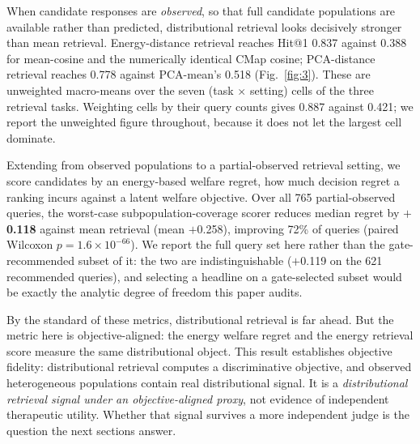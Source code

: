 \documentclass[11pt,letterpaper]{article}
\begin{document}
When candidate responses are \textit{observed}, so that full candidate populations are
available rather than predicted, distributional retrieval looks decisively stronger than mean
retrieval. Energy-distance retrieval reaches Hit@1 0.837 against 0.388 for
mean-cosine and the numerically identical CMap cosine; PCA-distance retrieval reaches 0.778 against
PCA-mean's 0.518 (Fig.~\ref{fig:3}). These are unweighted macro-means over the seven (task
$\times$ setting) cells of the three retrieval tasks. Weighting cells by their query counts gives
0.887 against 0.421; we report the unweighted figure throughout, because it does not let the
largest cell dominate.

Extending from observed populations to a partial-observed retrieval setting, we score candidates
by an energy-based welfare regret, how much decision regret a ranking incurs against a latent
welfare objective. Over all 765 partial-observed queries, the worst-case
subpopulation-coverage scorer reduces median regret by \textbf{$+$0.118} against mean retrieval
(mean $+$0.258), improving 72\% of queries (paired Wilcoxon
$p = 1.6\times10^{-66}$). We report the full query set here rather than the
gate-recommended subset of it: the two are indistinguishable ($+$0.119 on the 621 recommended
queries), and selecting a headline on a gate-selected subset would be exactly the analytic degree
of freedom this paper audits.

By the standard of these metrics, distributional retrieval is far ahead. But the metric
here is objective-aligned: the energy welfare regret and the energy retrieval score measure
the same distributional object. This result establishes objective fidelity: distributional retrieval computes a
discriminative objective, and observed heterogeneous populations contain real distributional
signal. It is a \textit{distributional retrieval signal under an objective-aligned proxy}, not
evidence of independent therapeutic utility. Whether that signal survives a more independent
judge is the question the next sections answer.
\end{document}
